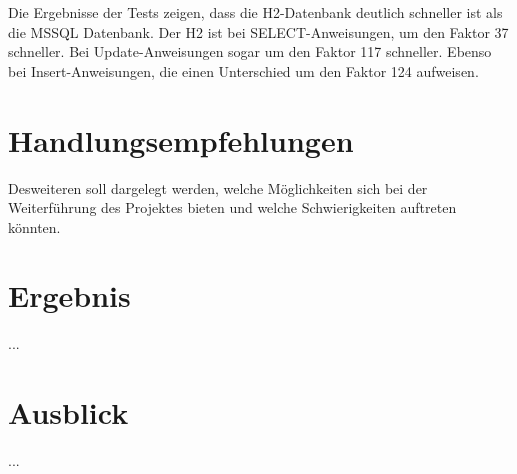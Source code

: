 Die Ergebnisse der Tests zeigen, dass die H2-Datenbank deutlich schneller ist als die MSSQL Datenbank. Der H2 ist bei SELECT-Anweisungen, um den Faktor 37 schneller. Bei Update-Anweisungen sogar um den Faktor 117 schneller. Ebenso bei Insert-Anweisungen, die einen Unterschied um den Faktor 124 aufweisen. 

\section{Handlungsempfehlungen}

Desweiteren soll dargelegt werden, welche Möglichkeiten sich bei der Weiterführung des Projektes bieten und welche Schwierigkeiten auftreten könnten.

\section{Ergebnis}

...

\section{Ausblick}

...